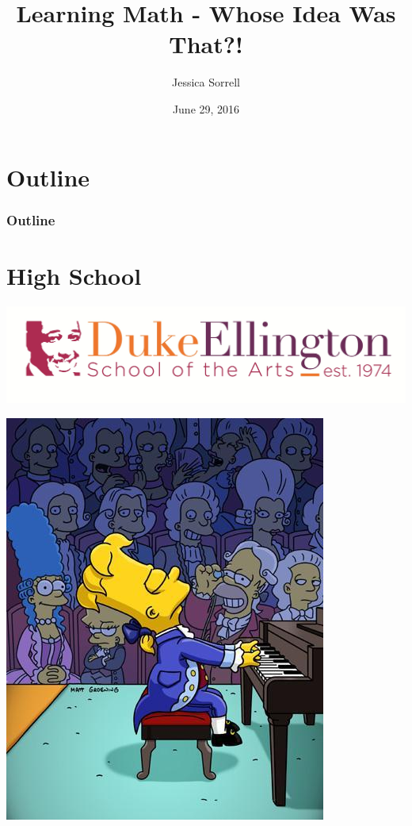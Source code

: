 \documentclass{beamer}
\title{Learning Math - Whose Idea Was That?! }
\author{Jessica Sorrell}
\institute{EMC}
\date{June 29, 2016}
\theoremstyle{mystyle}
\begin{document}

\begin{frame}
	\titlepage
\end{frame}

\section*{Outline}

\begin{frame}
	\frametitle{Outline}
	\tableofcontents

\end{frame}

\section{High School}
\frame{\tableofcontents[currentsection]}

\begin{frame}

\begin{center}
	\includegraphics[scale=0.5]{desa.jpg}
	
	\includegraphics[scale=0.35]{bartpianist.jpg}
\end{center}
	
\end{frame}
\end{document}
